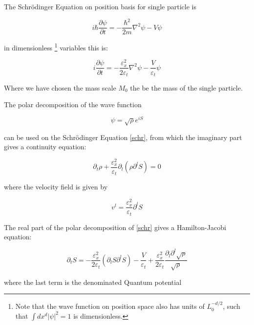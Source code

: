 \documentclass[a4paper,12pt]{article}
\begin{document}
The Schr\"odinger Equation on position basis for single particle is

\begin{equation}\label{schr_dim}
i \hbar \frac{\partial \psi}{\partial t} = - \frac{\hbar^2}{2m}\nabla^2 \psi - V \psi
\end{equation}

in dimensionless \footnote{Note that the wave function on position space also has units of $L_0^{-d/2}$, such that $\int dx^d |\psi|^2 = 1$ is dimensionless.} variables this is:

\begin{equation}\label{schr}
i  \frac{\partial \psi}{\partial t} = - \frac{\varepsilon_x^2}{2 \varepsilon_t} \nabla^2 \psi - \frac{V}{\varepsilon_t} \psi
\end{equation}

Where we have chosen the mass scale $M_0$ the be the mass of the single particle.

The polar decomposition of the wave function

\begin{equation}\label{psi_polar}
\psi = \sqrt{\rho} e^{iS}
\end{equation}



can be used on the Schr\"odinger Equation \ref{schr}, from which the imaginary part gives a continuity equation:

\begin{equation}\label{cont_schr}
\partial_t \rho + \frac{\varepsilon_x^2}{\varepsilon_t} \partial_l \left( \rho \partial^l S \right) = 0
\end{equation}

where the velocity field is given by 

\begin{equation}\label{real_vel_field}
v^l = \frac{\varepsilon_x^2}{\varepsilon_t} \partial^l S
\end{equation}

The real part of the polar decomposition of \ref{schr} gives a Hamilton-Jacobi equation:

\begin{equation}\label{hj_schr}
\partial_t S =   -\frac{\varepsilon_x^2}{2 \varepsilon_t} ( \partial_l S \partial^l S) - \frac{V}{\varepsilon_t} + \frac{\varepsilon_x^2}{2 \varepsilon_t} \frac{\partial_l \partial^l \sqrt{\rho}}{\sqrt{\rho}}
\end{equation}

where the last term is the denominated Quantum potential
\end{document}
